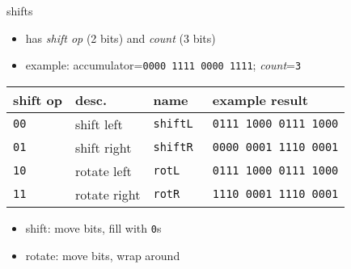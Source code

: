 \begin{frame}{shifts}
    \begin{itemize}
        \item has \textit{shift op} (2 bits) and \textit{count} (3 bits)
        \item example: accumulator={\tt \textcolor{s1}{0000} \textcolor{s2}{1111} \textcolor{s3}{0000} \textcolor{s4}{1111}}; \textit{count}={\tt 3}
    \end{itemize}
\begin{tabular}{l|l|l|l}
shift op & desc. & name & example result \\ \hline
\tt 00 & shift left & \tt shiftL &  {\tt \textcolor{s1}{0}\textcolor{s2}{111 1}\textcolor{s3}{000 0}\textcolor{s4}{111 1}\textcolor{s0}{000}} \\
\tt 01 & shift right& \tt shiftR & {\tt \textcolor{s0}{000}\textcolor{s1}{0 000}\textcolor{s2}{1 111}\textcolor{s3}{0 000}\textcolor{s4}{1}} \\
\tt 10 & rotate left & \tt rotL & {\tt \textcolor{s1}{0}\textcolor{s2}{111 1}\textcolor{s3}{000 0}\textcolor{s4}{111 1}\textcolor{s1}{000}} \\
\tt 11 & rotate right& \tt rotR & {\tt \textcolor{s4}{111}\textcolor{s1}{0 000}\textcolor{s2}{1 111}\textcolor{s3}{0 000}\textcolor{s4}{1}} \\
\end{tabular}
    \begin{itemize}
    \item shift: move bits, fill with {\tt 0}s
    \item rotate: move bits, wrap around
    \end{itemize}
\end{frame}

